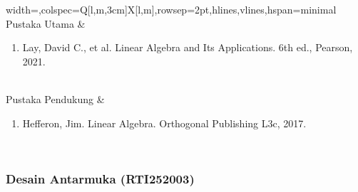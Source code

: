 \begin{longtblr}{width=\textwidth,colspec={Q[l,m,3cm]X[l,m]},rowsep=2pt,hlines,vlines,hspan=minimal}
Pustaka Utama & \begin{enumerate}\item Lay, David C., et al. Linear Algebra and Its Applications. 6th ed., Pearson, 2021.\end{enumerate} \\
Pustaka Pendukung & \begin{enumerate}\item Hefferon, Jim. Linear Algebra. Orthogonal Publishing L3c, 2017.\end{enumerate} \\
\end{longtblr}

\subsubsection*{Desain Antarmuka (RTI252003)}
